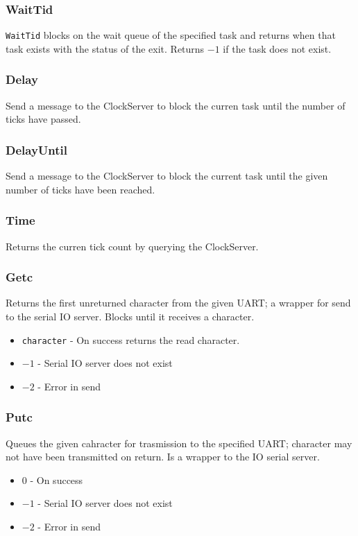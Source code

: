 \documentclass[12pt]{article}
\begin{document}
\subsubsection{WaitTid}
\texttt{WaitTid} blocks on the wait queue of the specified task and returns when that task exists with the status of the exit.  Returns $-1$ if the task does not exist.
\\
\subsubsection{Delay}
Send a message to the ClockServer to block the curren task until the number of ticks have passed.
\\
\subsubsection{DelayUntil}
Send a message to the ClockServer to block the current task until the given number of ticks have been reached.
\\
\subsubsection{Time}
Returns the curren tick count by querying the ClockServer.
\\
\subsubsection{Getc}
Returns the first unreturned character from the given UART; a wrapper for send to the serial IO server.  Blocks until it receives a character.
\begin{itemize}
  \item \texttt{character} - On success returns the read character.
  \item $-1$ - Serial IO server does not exist
  \item $-2$ - Error in send
    \\
\end{itemize}
\subsubsection{Putc}
Queues the given cahracter for trasmission to the specified UART; character may not have been transmitted on return.  Is a wrapper to the IO serial server.
\begin{itemize}
  \item $0$ - On success
  \item $-1$ - Serial IO server does not exist
  \item $-2$ - Error in send
    \\
\end{itemize}
\end{document}
